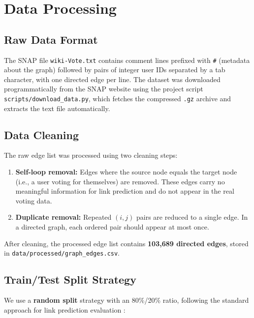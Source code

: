 \documentclass[10pt]{article}
\begin{document}
\section{Data Processing}
\label{sec:processing}

\subsection{Raw Data Format}

The SNAP file \texttt{wiki-Vote.txt} contains comment lines prefixed with \texttt{\#} (metadata about the graph) followed by pairs of integer user IDs separated by a tab character, with one directed edge per line. The dataset was downloaded programmatically from the SNAP website using the project script \texttt{scripts/download\_data.py}, which fetches the compressed \texttt{.gz} archive and extracts the text file automatically.

\subsection{Data Cleaning}

The raw edge list was processed using two cleaning steps:

\begin{enumerate}
  \item \textbf{Self-loop removal:} Edges where the source node equals the target node (i.e., a user voting for themselves) are removed. These edges carry no meaningful information for link prediction and do not appear in the real voting data.
  \item \textbf{Duplicate removal:} Repeated $(i, j)$ pairs are reduced to a single edge. In a directed graph, each ordered pair should appear at most once.
\end{enumerate}

After cleaning, the processed edge list contains \textbf{103,689 directed edges}, stored in \texttt{data/processed/graph\_edges.csv}.

\subsection{Train/Test Split Strategy}

We use a \textbf{random split} strategy with an 80\%/20\% ratio, following the standard approach for link prediction evaluation \cite{libennowell2003}:
\end{document}
